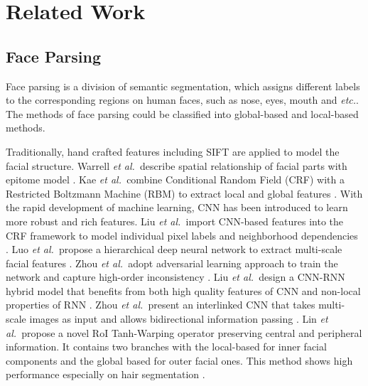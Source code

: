 \documentclass[runningheads]{llncs}
\def\et{{\it et al.~}}
\def\etc{{\it etc.}}
\begin{document}
\section{Related Work}



\subsection{Face Parsing}
Face parsing is a division of semantic segmentation, which assigns different labels to the corresponding regions on human faces, such as nose, eyes, mouth and \etc. The methods of face parsing could be classified into global-based and local-based methods. 

Traditionally, hand crafted features including SIFT \cite{smith2013exemplar} are applied to model the facial structure. Warrell \et describe spatial relationship of facial parts with epitome model \cite{warrell2009labelfaces}. Kae \et combine Conditional Random Field (CRF) with a Restricted Boltzmann Machine (RBM) to extract local and global features \cite{kae2013augmenting}. With the rapid development of machine learning, CNN has been introduced to learn more robust and rich features. Liu \et import CNN-based features into the CRF framework to model individual pixel labels and neighborhood dependencies \cite{liu2015multi}. Luo \et propose a hierarchical deep neural network to extract multi-scale facial features \cite{luo2012hierarchical}. Zhou \et adopt adversarial learning approach to train the network and capture high-order inconsistency \cite{zhou2013extensive}. Liu \et design a CNN-RNN hybrid model that benefits from both high quality features of CNN and non-local properties of RNN \cite{liu2017face}. Zhou \et present an interlinked CNN that takes multi-scale images as input and allows bidirectional information passing \cite{zhou2015interlinked}. Lin \et propose a novel RoI Tanh-Warping operator preserving central and peripheral information. It contains two branches with the local-based for inner facial components and the global based for outer facial ones. This method shows high performance especially on hair segmentation \cite{lin2019face}.
\end{document}
